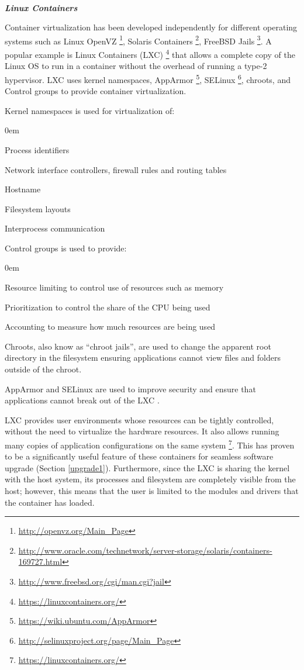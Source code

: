 \documentclass[a4paper,11pt,twoside]{article}
\begin{document}
\noindent
\\\textbf{\textit{Linux Containers}}

\noindent
Container virtualization has been developed independently for different operating systems such as Linux OpenVZ \footnote{\url{http://openvz.org/Main_Page}}, Solaris Containers \footnote{\url{http://www.oracle.com/technetwork/server-storage/solaris/containers-169727.html}}, FreeBSD Jails \footnote{\url{http://www.freebsd.org/cgi/man.cgi?jail}}. A popular example is Linux Containers (LXC) \footnote{\label{LCX} \url{https://linuxcontainers.org/}} that allows a complete copy of the Linux OS to run in a container without the overhead of running a type-2 hypervisor. LXC uses kernel namespaces, AppArmor \footnote{\url{https://wiki.ubuntu.com/AppArmor}}, SELinux \footnote{\url{http://selinuxproject.org/page/Main_Page}}, chroots, and Control groups to provide container virtualization. 

\noindent
Kernel namespaces is used for virtualization of:

\begin{list}{-}{}
  \itemsep0em
  \item Process identifiers
  \item Network interface controllers, firewall rules and routing tables
  \item Hostname
  \item Filesystem layouts 
  \item Interprocess communication
  \end{list}

\noindent 
Control groups is used to provide:

\begin{list}{-}{}
  \itemsep0em
  \item Resource limiting to control use of resources such as memory
  \item Prioritization to control the share of the CPU being used
  \item Accounting to measure how much resources are being used
  \end{list}

\noindent
Chroots, also know as “chroot jails”, are used to change the apparent root directory in the filesystem ensuring applications cannot view files and folders outside of the chroot.

AppArmor and SELinux are used to improve security and ensure that applications cannot break out of the LXC \cite{security}.

LXC provides user environments whose resources can be tightly controlled, without the need to virtualize the hardware resources. It also allows running many copies of application configurations on the same system \footnote{\url{https://linuxcontainers.org/}}. This has proven to be a significantly useful feature of these containers for seamless software upgrade (Section \ref{upgrade1}). Furthermore, since the LXC is sharing the kernel with the host system, its processes and filesystem are completely visible from the host; however, this means that the user is limited to the modules and drivers that the container has loaded. \\
\end{document}
